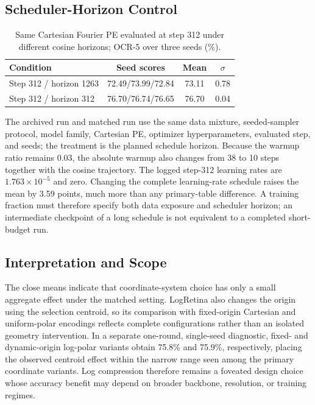 \documentclass{article}
\begin{document}
\subsection{Scheduler-Horizon Control}

\begin{table}[!t]
\centering
\caption{Same Cartesian Fourier PE evaluated at step 312 under
different cosine horizons; OCR-5 over three seeds (\%).}
\label{tab:robust}
\setlength{\tabcolsep}{4pt}
\small
\begin{tabular}{lccc}
\toprule
Condition & Seed scores & Mean & $\sigma$ \\
\midrule
Step 312 / horizon 1263 & 72.49/73.99/72.84 & 73.11 & 0.78 \\
Step 312 / horizon 312 & 76.70/76.74/76.65 & 76.70 & 0.04 \\
\bottomrule
\end{tabular}
\end{table}

The archived run and matched run use the same data mixture,
seeded-sampler protocol, model family, Cartesian PE, optimizer
hyperparameters, evaluated step, and seeds; the treatment is the
planned schedule horizon. Because the warmup ratio remains 0.03,
the absolute warmup also changes from 38 to 10 steps together
with the cosine trajectory. The logged
step-312 learning rates are $1.763\times10^{-5}$ and zero.
Changing the complete learning-rate schedule raises the mean by 3.59 points, much more
than any primary-table difference. A training fraction must
therefore specify both data exposure and scheduler horizon;
an intermediate checkpoint of a long schedule is not
equivalent to a completed short-budget run.

\subsection{Interpretation and Scope}

The close means indicate that coordinate-system choice has only
a small aggregate effect under the matched setting. LogRetina
also changes the origin using the selection centroid, so its
comparison with fixed-origin Cartesian and uniform-polar
encodings reflects complete configurations rather than an
isolated geometry intervention. In a separate one-round,
single-seed diagnostic, fixed- and dynamic-origin log-polar
variants obtain 75.8\% and 75.9\%, respectively, placing the
observed centroid effect within the narrow range seen among the
primary coordinate variants. Log compression therefore remains
a foveated design choice whose accuracy benefit may depend on
broader backbone, resolution, or training regimes.
\end{document}
